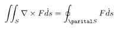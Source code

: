 \documentclass[preview]{standalone}
\begin{document}
\begin{align*}
\iint_S \nabla \times F \dot ds = \oint_{\parital S} F\dot ds
\end{align*}
\end{document}
